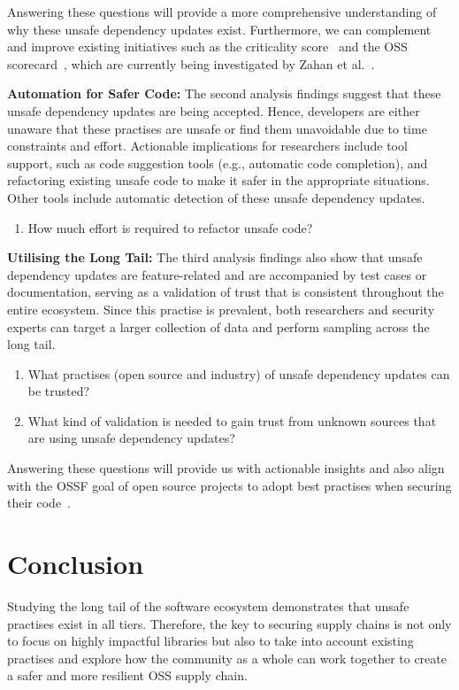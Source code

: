 \documentclass[sigconf,screen]{acmart}
\begin{document}
\begin{sloppy}
Answering these questions will provide a more comprehensive understanding of why these unsafe dependency updates exist.
Furthermore, we can complement and improve existing initiatives such as the criticality score~\citep{GitHubos50:online} and the OSS scorecard~\citep{GitHubos53:online}, which are currently being investigated by Zahan et al.~\citep{zahan:icse2023}.


\textbf{Automation for Safer Code:} The second analysis findings suggest that these unsafe dependency updates are being accepted.
Hence, developers are either unaware that these practises are unsafe or find them unavoidable due to time constraints and effort.
Actionable implications for researchers include tool support, such as code suggestion tools (e.g., automatic code completion), and refactoring existing unsafe code to make it safer in the appropriate situations.
Other tools include automatic detection of these unsafe dependency updates.
\begin{enumerate}[resume]
   
    \item How much effort is required to refactor unsafe code?

\end{enumerate}
\textbf{Utilising the Long Tail:}
The third analysis findings also show that unsafe dependency updates are feature-related and are accompanied by test cases or documentation, serving as a validation of trust that is consistent throughout the entire ecosystem.
Since this practise is prevalent, both researchers and security experts can target a larger collection of data and perform sampling across the long tail.

\begin{enumerate}[resume]
   
    \item What practises (open source and industry) of unsafe dependency updates can be trusted?
    \item What kind of validation is needed to gain trust from unknown sources that are using unsafe dependency updates?
 
\end{enumerate}

Answering these questions will provide us with actionable insights and also align with the OSSF goal of open source projects to adopt best practises when securing their code~\citep{GitHubos27:online}.



\section{Conclusion}
Studying the long tail of the software ecosystem demonstrates that unsafe practises exist in all tiers.
Therefore, the key to securing supply chains is not only to focus on highly impactful libraries but also to take into account existing practises and explore how the community as a whole can work together to create a safer and more resilient OSS supply chain.


\end{sloppy}
\end{document}
